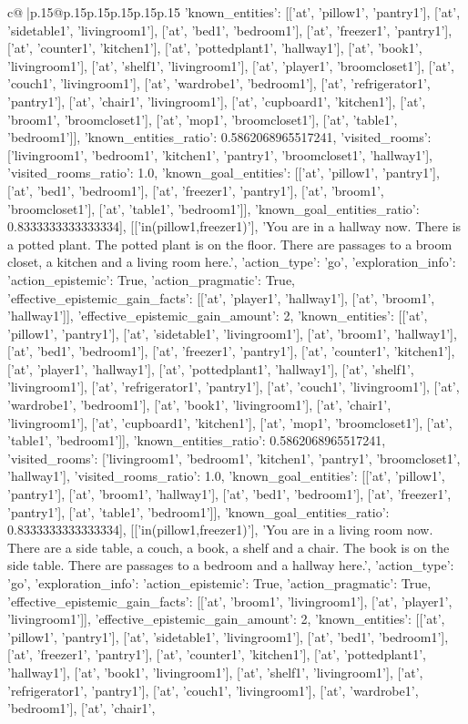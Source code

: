 \documentclass{article}
\begin{document}
{\begin{supertabular}{c@{$\;$}|p{.15\linewidth}@{}p{.15\linewidth}p{.15\linewidth}p{.15\linewidth}p{.15\linewidth}p{.15\linewidth}}
{{{'known_entities': [['at', 'pillow1', 'pantry1'], ['at', 'sidetable1', 'livingroom1'], ['at', 'bed1', 'bedroom1'], ['at', 'freezer1', 'pantry1'], ['at', 'counter1', 'kitchen1'], ['at', 'pottedplant1', 'hallway1'], ['at', 'book1', 'livingroom1'], ['at', 'shelf1', 'livingroom1'], ['at', 'player1', 'broomcloset1'], ['at', 'couch1', 'livingroom1'], ['at', 'wardrobe1', 'bedroom1'], ['at', 'refrigerator1', 'pantry1'], ['at', 'chair1', 'livingroom1'], ['at', 'cupboard1', 'kitchen1'], ['at', 'broom1', 'broomcloset1'], ['at', 'mop1', 'broomcloset1'], ['at', 'table1', 'bedroom1']], 'known_entities_ratio': 0.5862068965517241, 'visited_rooms': ['livingroom1', 'bedroom1', 'kitchen1', 'pantry1', 'broomcloset1', 'hallway1'], 'visited_rooms_ratio': 1.0, 'known_goal_entities': [['at', 'pillow1', 'pantry1'], ['at', 'bed1', 'bedroom1'], ['at', 'freezer1', 'pantry1'], ['at', 'broom1', 'broomcloset1'], ['at', 'table1', 'bedroom1']], 'known_goal_entities_ratio': 0.8333333333333334}}], [['in(pillow1,freezer1)'], 'You are in a hallway now. There is a potted plant. The potted plant is on the floor. There are passages to a broom closet, a kitchen and a living room here.', {'action_type': 'go', 'exploration_info': {'action_epistemic': True, 'action_pragmatic': True, 'effective_epistemic_gain_facts': [['at', 'player1', 'hallway1'], ['at', 'broom1', 'hallway1']], 'effective_epistemic_gain_amount': 2, 'known_entities': [['at', 'pillow1', 'pantry1'], ['at', 'sidetable1', 'livingroom1'], ['at', 'broom1', 'hallway1'], ['at', 'bed1', 'bedroom1'], ['at', 'freezer1', 'pantry1'], ['at', 'counter1', 'kitchen1'], ['at', 'player1', 'hallway1'], ['at', 'pottedplant1', 'hallway1'], ['at', 'shelf1', 'livingroom1'], ['at', 'refrigerator1', 'pantry1'], ['at', 'couch1', 'livingroom1'], ['at', 'wardrobe1', 'bedroom1'], ['at', 'book1', 'livingroom1'], ['at', 'chair1', 'livingroom1'], ['at', 'cupboard1', 'kitchen1'], ['at', 'mop1', 'broomcloset1'], ['at', 'table1', 'bedroom1']], 'known_entities_ratio': 0.5862068965517241, 'visited_rooms': ['livingroom1', 'bedroom1', 'kitchen1', 'pantry1', 'broomcloset1', 'hallway1'], 'visited_rooms_ratio': 1.0, 'known_goal_entities': [['at', 'pillow1', 'pantry1'], ['at', 'broom1', 'hallway1'], ['at', 'bed1', 'bedroom1'], ['at', 'freezer1', 'pantry1'], ['at', 'table1', 'bedroom1']], 'known_goal_entities_ratio': 0.8333333333333334}}], [['in(pillow1,freezer1)'], 'You are in a living room now. There are a side table, a couch, a book, a shelf and a chair. The book is on the side table. There are passages to a bedroom and a hallway here.', {'action_type': 'go', 'exploration_info': {'action_epistemic': True, 'action_pragmatic': True, 'effective_epistemic_gain_facts': [['at', 'broom1', 'livingroom1'], ['at', 'player1', 'livingroom1']], 'effective_epistemic_gain_amount': 2, 'known_entities': [['at', 'pillow1', 'pantry1'], ['at', 'sidetable1', 'livingroom1'], ['at', 'bed1', 'bedroom1'], ['at', 'freezer1', 'pantry1'], ['at', 'counter1', 'kitchen1'], ['at', 'pottedplant1', 'hallway1'], ['at', 'book1', 'livingroom1'], ['at', 'shelf1', 'livingroom1'], ['at', 'refrigerator1', 'pantry1'], ['at', 'couch1', 'livingroom1'], ['at', 'wardrobe1', 'bedroom1'], ['at', 'chair1', }}}
\end{supertabular}}
\end{document}
